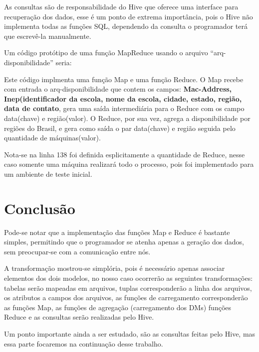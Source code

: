 \documentclass[a4paper,12pt]{article}
\begin{document}
As consultas são de responsabilidade do Hive que oferece uma interface para
recuperação dos dados, esse é um ponto de extrema importância, pois o Hive não
implementa todas as funções SQL, dependendo da consulta o programador terá que
escrevê-la manualmente.

Um código protótipo de uma função MapReduce usando o arquivo
“arq-disponibilidade” seria:



Este código implmenta uma função Map e uma função Reduce. O Map recebe com entrada
o arq-disponibilidade que contem os campos: \textbf{Mac-Address, Inep(identificador
da escola, nome da escola, cidade, estado, região, data de contato}, gera uma saída
intermediária para o Reduce com os campo data(chave) e região(valor). O Reduce,
por sua vez, agrega a disponibilidade por regiões do Brasil, e gera como saída
o par data(chave) e região seguida pelo quantidade de máquinas(valor).

Nota-se na linha 138 foi definida esplicitamente a quantidade de Reduce, nesse caso
somente uma máquina realizará todo o processo, pois foi implementado para um ambiente
de teste inicial.

\section{\textbf{Conclusão}}
Pode-se notar que a implementação das funções Map e Reduce é bastante simples,
permitindo que o programador se atenha apenas a geração dos dados, sem preocupar-se
com a comunicação entre nós.

A transformação mostrou-se simplória, pois é necessário apenas associar elementos
dos dois modelos, no nosso caso ocorrerão as seguintes transformações: tabelas serão
mapeadas em arquivos, tuplas corresponderão a linha dos arquivos, os atributos a 
campos dos arquivos, as funções de carregamento corresponderão as funções Map, as 
funções de agregação (carregamento dos DMs) funções Reduce e as consultas serão
realizadas pelo Hive.

Um ponto importante ainda a ser estudado, são as consultas feitas pelo Hive, mas
essa parte focaremos na continuação desse trabalho. 



\end{document}
